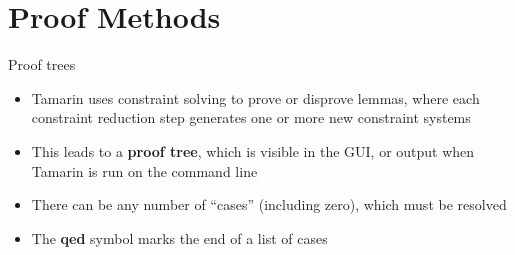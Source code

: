 \documentclass[11pt,aspectratio=169]{beamer}
\begin{document}

\section{Proof Methods}


\begin{frame}[fragile]{Proof trees}
    \begin{itemize}
        \item Tamarin uses constraint solving to prove or disprove lemmas, 
              where each constraint reduction step generates one or more new 
              constraint systems
        \item This leads to a \textbf{proof tree}, which is visible in the GUI, 
              or output when Tamarin is run on the command line
        \item There can be any number of ``cases'' (including zero), which must 
              be resolved
        \item The \textbf{qed} symbol marks the end of a list of cases
    \end{itemize}
\end{frame}
\end{document}
